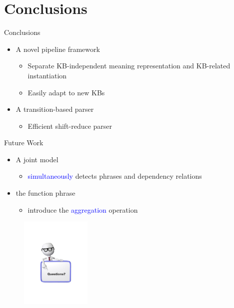 \documentclass{beamer}
\begin{document}
\section{Conclusions}
\begin{frame}{Conclusions}
  	\begin{itemize}
		\item A novel pipeline framework
			\begin{itemize}
				\item Separate KB-independent meaning representation and KB-related instantiation
				\item Easily adapt to new KBs
			\end{itemize}
		\item A transition-based parser
			\begin{itemize}
				\item Efficient shift-reduce parser
			\end{itemize}
	\end{itemize}
\end{frame}

\begin{frame}{Future Work}
\begin{itemize}
\item A joint model
	\begin{itemize}
		\item \textcolor{blue}{simultaneously} detects phrases and dependency relations
	\end{itemize}
\item the function phrase
	\begin{itemize}
		\item introduce the \textcolor{blue}{aggregation} operation \\
	\end{itemize}
\end{itemize}
\end{frame}

\begin{frame}
\centering
\begin{figure}
		\centering\includegraphics[width=0.3\textwidth]{introduction/QA.pdf}
	\end{figure}
\end{frame}
\end{document}
